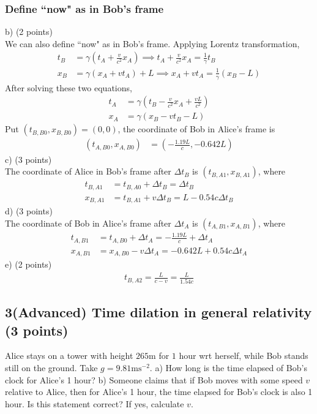 \documentclass[12pt]{book} %
\numberwithin{equation}{chapter}
\def\c{\gamma}
\def\D{\Delta}
\def\lq{\hspace{2.5ex}}
\begin{document}
\begin{solbox}
\subsubsection{Define ``now" as in Bob's frame}
b) (2 points)\\
We can also define ``now" as in Bob's frame. Applying Lorentz transformation,
\begin{align*}
t_{B}&=\c\left(t_{A}+\frac{v}{c^{2}}x_{A}\right)\implies t_{A}+\frac{v}{c^{2}}x_{A}=\frac{1}{\c}t_{B}\\
x_{B}&=\c\left(x_{A}+vt_{A}\right)+L\implies x_{A}+vt_{A}=\frac{1}{\c}\left(x_{B}-L\right)
\end{align*}
After solving these two equations,
\begin{align*}
t_{A}&=\c\left(t_{B}-\frac{v}{c^{2}}x_{A}+\frac{vL}{c^{2}}\right)\\
x_{A}&=\c\left(x_{B}-vt_{B}-L\right)
\end{align*}
Put $\left(t_{B, B0}, x_{B, B0}\right)=(0, 0)$, the coordinate of Bob in Alice's frame is
\begin{align*}
\left(t_{A, B0}, x_{A, B0}\right)&=\left(-\frac{1.19L}{c}, -0.642L\right)
\end{align*}
c) (3 points)\\
The coordinate of Alice in Bob's frame after $\D t_{B}$ is $\left(t_{B, A1}, x_{B, A1}\right)$, where
\begin{align*}
t_{B, A1}&=t_{B, A0}+\D t_{B}=\D t_{B}\\
x_{B, A1}&=t_{B, A1}+v\D t_{B}=L-0.54c\D t_{B}
\end{align*}
d) (3 points)\\
The coordinate of Bob in Alice's frame after $\D t_{A}$ is $\left(t_{A, B1}, x_{A, B1}\right)$, where
\begin{align*}
t_{A, B1}&=t_{A, B0}+\D t_{A}=-\frac{1.19L}{c}+\D t_{A}\\
x_{A, B1}&=x_{A, B0}-v\D t_{A}=-0.642L+0.54c\D t_{A}
\end{align*}
e) (2 points)
\begin{align*}
t_{B, A2}=\frac{L}{c-v}=\frac{L}{1.54c}
\end{align*}
\end{solbox}

\subsection*{3\lq (Advanced) Time dilation in general relativity (3 points)}
Alice stays on a tower with height $265\text{m}$ for $1$ hour wrt herself, while Bob stands still on the ground. Take $g=9.81\text{m}\text{s}^{-2}$.\bigskip\newline
a) How long is the time elapsed of Bob's clock for Alice's 1 hour?\bigskip\newline
b) Someone claims that if Bob moves with some speed $v$ relative to Alice, then for Alice's 1 hour, the time elapsed for Bob's clock is also 1 hour. Is this statement correct? If yes, calculate $v$.
\end{document}
